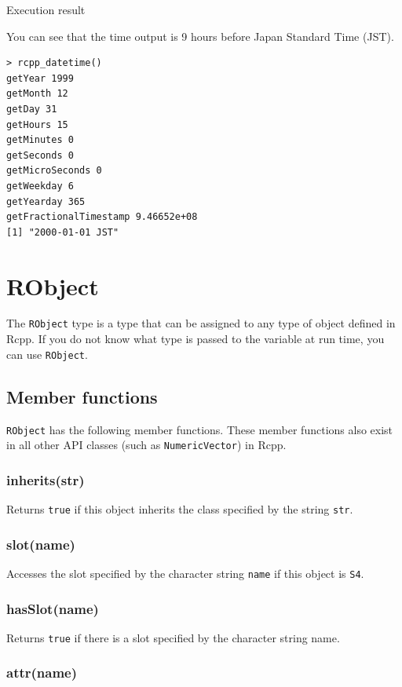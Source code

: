 \documentclass[]{book}
\theoremstyle{definition}
\theoremstyle{definition}
\theoremstyle{remark}
\begin{document}
Execution result

You can see that the time output is 9 hours before Japan Standard Time
(JST).

\begin{verbatim}
> rcpp_datetime()
getYear 1999
getMonth 12
getDay 31
getHours 15
getMinutes 0
getSeconds 0
getMicroSeconds 0
getWeekday 6
getYearday 365
getFractionalTimestamp 9.46652e+08
[1] "2000-01-01 JST"
\end{verbatim}

\chapter{RObject}\label{robject}

The \texttt{RObject} type is a type that can be assigned to any type of
object defined in Rcpp. If you do not know what type is passed to the
variable at run time, you can use \texttt{RObject}.

\section{Member functions}\label{member-functions-7}

\texttt{RObject} has the following member functions. These member
functions also exist in all other API classes (such as
\texttt{NumericVector}) in Rcpp.

\subsection{inherits(str)}\label{inheritsstr-1}

Returns \texttt{true} if this object inherits the class specified by the
string \texttt{str}.

\subsection{slot(name)}\label{slotname}

Accesses the slot specified by the character string \texttt{name} if
this object is \texttt{S4}.

\subsection{hasSlot(name)}\label{hasslotname}

Returns \texttt{true} if there is a slot specified by the character
string name.

\subsection{attr(name)}\label{attrname}
\end{document}
